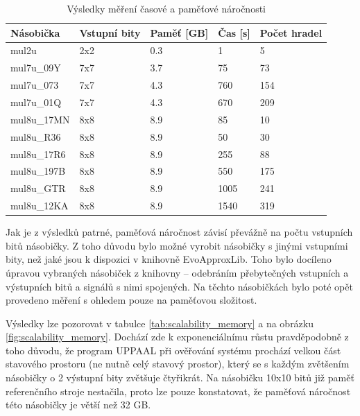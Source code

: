 \begin{table}[!ht]
    \centering
    \begin{tabular}{|l|l|l|l|l|}
        \textbf{Násobička} & \textbf{Vstupní bity} & \textbf{Paměť [GB]} & \textbf{Čas [s]} & \textbf{Počet hradel} \\ \hline
        mul2u & 2x2 & 0.3 & 1 & 5 \\ 
        mul7u\_09Y & 7x7 & 3.7 & 75 & 73 \\ 
        mul7u\_073 & 7x7 & 4.3 & 760 & 154 \\ 
        mul7u\_01Q & 7x7 & 4.3 & 670 & 209 \\ 
        mul8u\_17MN & 8x8 & 8.9 & 85 & 10 \\ 
        mul8u\_R36 & 8x8 & 8.9 & 50 & 30 \\ 
        mul8u\_17R6 & 8x8 & 8.9 & 255 & 88 \\ 
        mul8u\_197B & 8x8 & 8.9 & 550 & 175 \\ 
        mul8u\_GTR & 8x8 & 8.9 & 1005 & 241 \\ 
        mul8u\_12KA & 8x8 & 8.9 & 1540 & 319 \\ 
    \end{tabular}
    \caption{Výsledky měření časové a paměťové náročnosti}
    \label{tab:scalability}
\end{table}

Jak je z výsledků patrné, paměťová náročnost závisí převážně na počtu vstupních bitů násobičky. Z toho důvodu bylo možné vyrobit násobičky s jinými vstupními bity, než jaké jsou k dispozici v knihovně EvoApproxLib. Toho bylo docíleno úpravou vybraných násobiček z knihovny -- odebráním přebytečných vstupních a výstupních bitů a signálů s nimi spojených. Na těchto násobičkách bylo poté opět provedeno měření s ohledem pouze na paměťovou složitost.

Výsledky lze pozorovat v tabulce \ref{tab:scalability_memory} a na obrázku \ref{fig:scalability_memory}. Dochází zde k exponenciálnímu růstu pravděpodobně z toho důvodu, že program UPPAAL při ověřování systému prochází velkou část stavového prostoru (ne nutně celý stavový prostor), který se s každým zvětšením násobičky o 2 výstupní bity zvětšuje čtyřikrát. Na násobičku 10x10 bitů již paměť referenčního stroje nestačila, proto lze pouze konstatovat, že paměťová náročnost této násobičky je větší než 32 GB.

